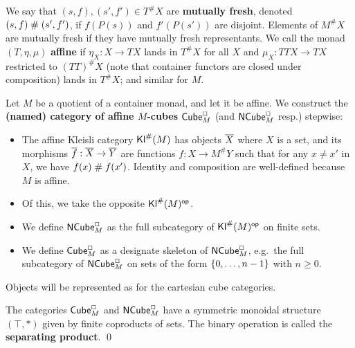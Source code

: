 \documentclass[a4paper]{article}
\begin{document}
We say that $(s, f), (s', f') \in T^\# X$ are \textbf{mutually fresh}, denoted $(s, f) \mathrel{\#} (s', f')$, if $f(P(s))$ and $f'(P(s'))$ are disjoint.
Elements of $M^\# X$ are mutually fresh if they have mutually fresh representants.
We call the monad $(T, \eta, \mu)$ \textbf{affine} if $\eta_X : X \to TX$ lands in $T^\# X$ for all $X$ and $\mu_X : TTX \to TX$ restricted to $(TT)^\# X$ (note that container functors are closed under composition) lands in $T^\# X$; and similar for $M$.

\begin{definition}
Let $M$ be a quotient of a container monad, and let it be affine.
We construct the \textbf{(named) category of affine $M$-cubes ${\mathsf{Cube}}_M^\Box$} (and ${\mathsf{NCube}}_M^\Box$ resp.) stepwise:
\begin{itemize}
	\item The affine Kleisli category ${\mathsf{Kl}}^\#(M)$ has objects ${\overline{X}}$ where $X$ is a set, and its morphisms ${\overline{f}} : {\overline{X}} \to {\overline{Y}}$ are functions $f : X \to M^\#Y$ such that for any $x \neq x'$ in $X$, we have $f(x) \mathrel{\#} f(x')$.
	Identity and composition are well-defined because $M$ is affine.
	\item Of this, we take the opposite ${\mathsf{Kl}}^\#(M)^{\mathsf{op}}$.
	\item We define ${\mathsf{NCube}}_M^\Box$ as the full subcategory of ${\mathsf{Kl}}^\#(M)^{\mathsf{op}}$ on finite sets.
	\item We define ${\mathsf{Cube}}_M^\Box$ as a designate skeleton of ${\mathsf{NCube}}^\Box_M$, e.g.\ the full subcategory of ${\mathsf{NCube}}^\Box_M$ on sets of the form $\mathopen{}\left\{ 0, \ldots, n-1 \right\}\mathclose{}$ with $n \geq 0$.
\end{itemize}
\end{definition}
Objects will be represented as for the cartesian cube categories.

\begin{corollary}
The categories ${\mathsf{Cube}}^\Box_M$ and ${\mathsf{NCube}}^\Box_M$ have a symmetric monoidal structure $(\top, {*})$ given by finite coproducts of sets. The binary operation is called the \textbf{separating product}. \qed
\end{corollary}
\end{document}
